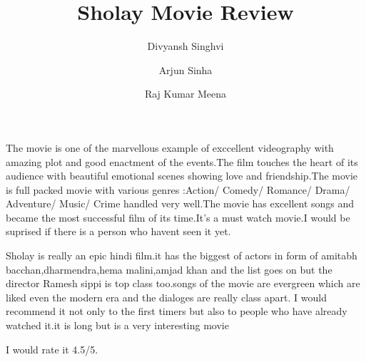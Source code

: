 \documentclass[]{article}
\title{Sholay Movie Review}
\author{Divyansh Singhvi
	\and
	Arjun Sinha
	\and
	Raj Kumar Meena}
\begin{document}
\maketitle
The movie is one of the marvellous example of exccellent videography with amazing plot and good enactment of the events.The film touches the heart of its audience with beautiful emotional scenes showing love and friendship.The movie is full packed movie with various genres :Action/ Comedy/ Romance/ Drama/ Adventure/ Music/ Crime  handled very well.The movie has excellent songs and became the most successful film of its time.It's a must watch movie.I would be suprised if there is a person who havent seen it yet.  


Sholay is really an epic hindi film.it has the biggest of actors in form of amitabh bacchan,dharmendra,hema malini,amjad khan and the list goes on but the director Ramesh sippi is top class too.songs of the movie are evergreen which are liked even the modern era and the dialoges are really class apart.
I would recommend it not only to the first timers but also to people who have already watched it.it is long but is a very interesting movie

I would rate it 4.5/5.
\end{document}
